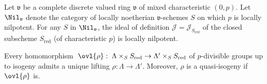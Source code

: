 \begin{para}\label{para:2.2.2} Let $\mathfrak{v}$ be a complete discrete
valued ring $\mathfrak{v}$ of mixed characteristic $(0,p)$. Let 
$\Nil_\mathfrak{v}$ denote the category of locally noetherian 
$\mathfrak{v}$-schemes $S$ on which $p$ is locally nilpotent.  For any
$S$ in $\Nil_\mathfrak{v}$, the ideal of definition 
$\mathcal{J}=\mathcal{J}_{S_{\mathrm{red}}}$ of the closed subscheme $S_{\mathrm{red}}$ 
(of characteristic $p$) is locally nilpotent.
\end{para}

\begin{thm}
 \label{thm:2.2.3}
 
 Every homomorphism
 $\;\ovl{\rho}:\;\Lambda\times_S S_{\mathrm{red}} \rightarrow \Lambda'\times_S
 S_{\mathrm{red}}$ of $p$-divisible groups up to isogeny admits a unique lifting
 $\rho: \Lambda \rightarrow \Lambda'$. Moreover, $\rho$ is a
 quasi-isogeny if $\ovl{\rho}$ is.
\end{thm}

